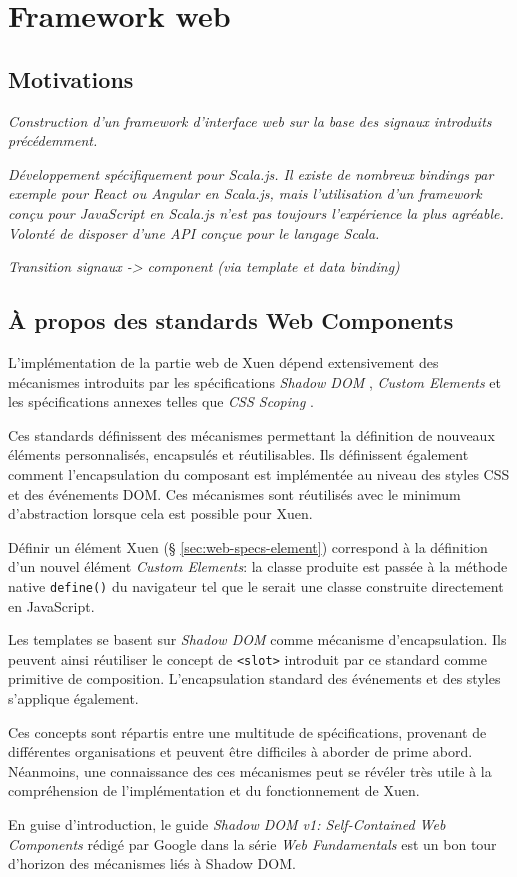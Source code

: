 \chapter{Framework web}

\section{Motivations}
\textit{Construction d'un framework d'interface web sur la base des signaux introduits précédemment.}

\textit{Développement spécifiquement pour Scala.js. Il existe de nombreux bindings par exemple pour React ou Angular en Scala.js, mais l'utilisation d'un framework conçu pour JavaScript en Scala.js n'est pas toujours l'expérience la plus agréable. Volonté de disposer d'une API conçue pour le langage Scala.}

\textit{Transition signaux -> component (via template et data binding)}

\section{À propos des standards Web Components}

L'implémentation de la partie web de Xuen dépend extensivement des mécanismes introduits par les spécifications \emph{Shadow DOM} \cite{w3c-shadowdom}, \emph{Custom Elements} \cite{w3c-custom-elements} et les spécifications annexes telles que \emph{CSS Scoping} \cite{w3c-css-scopings}.

Ces standards définissent des mécanismes permettant la définition de nouveaux éléments personnalisés, encapsulés et réutilisables. Ils définissent également comment l'encapsulation du composant est implémentée au niveau des styles CSS et des événements DOM. Ces mécanismes sont réutilisés avec le minimum d'abstraction lorsque cela est possible pour Xuen.

Définir un élément Xuen (§ \ref{sec:web-specs-element}) correspond à la définition d'un nouvel élément \emph{Custom Elements}: la classe produite est passée à la méthode native \texttt{define()} du navigateur tel que le serait une classe construite directement en JavaScript.

Les templates se basent sur \emph{Shadow DOM} comme mécanisme d'encapsulation. Ils peuvent ainsi réutiliser le concept de \texttt{<slot>} introduit par ce standard comme primitive de composition. L'encapsulation standard des événements et des styles s'applique également.

Ces concepts sont répartis entre une multitude de spécifications, provenant de différentes organisations et peuvent être difficiles à aborder de prime abord. Néanmoins, une connaissance des ces mécanismes peut se révéler très utile à la compréhension de l'implémentation et du fonctionnement de Xuen.

En guise d'introduction, le guide \emph{Shadow DOM v1: Self-Contained Web Components} \cite{google-shadowdom} rédigé par Google dans la série \emph{Web Fundamentals} est un bon tour d'horizon des mécanismes liés à Shadow DOM.



